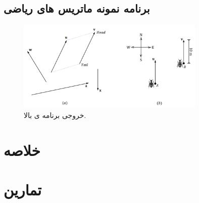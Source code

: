 \subsection{\textbf{برنامه نمونه ماتریس های ریاضی }}
{
    \Large
    \begin{spacing}{1.5}
        \textbf{\vspace{6pt}}
        \lr{}
        \textbf{\vspace{6pt}}


        \begin{figure}[H]
            \centering
            \setlength{\belowcaptionskip}{-10pt}
            \includegraphics[width=0.8\textwidth]{Images/4/4.Session.1.1.1}
            \caption {خروجی برنامه ی بالا.}
            \label{fig:4.Session.1.1.1}
        \end{figure}

    \end{spacing}
}
\newpage


\section{\textbf{خلاصه}}
\label{sec:2.9}
{
    \Large
    \begin{spacing}{1.5}
        \begin{enumerate}[label=\textbf{\arabic*}.]
            \textbf{\vspace{6pt}}
            \lr{}
            \textbf{\vspace{6pt}}
        \end{enumerate}
    \end{spacing}
}
\newpage


\section{\textbf{تمارین}}
\label{sec:2.10}
{
    \Large
    \begin{spacing}{1.5}
        \begin{enumerate}[label=\textbf{\arabic*}.]
        \end{enumerate}
    \end{spacing}
}